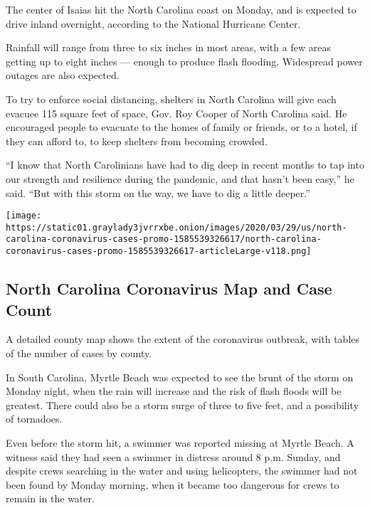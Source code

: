 The center of Isaias hit the North Carolina coast on Monday, and is
expected to drive inland overnight, according to the National Hurricane
Center.

Rainfall will range from three to six inches in most areas, with a few
areas getting up to eight inches --- enough to produce flash flooding.
Widespread power outages are also expected.

To try to enforce social distancing, shelters in North Carolina will
give each evacuee 115 square feet of space, Gov. Roy Cooper of North
Carolina said. He encouraged people to evacuate to the homes of family
or friends, or to a hotel, if they can afford to, to keep shelters from
becoming crowded.

``I know that North Carolinians have had to dig deep in recent months to
tap into our strength and resilience during the pandemic, and that
hasn't been easy,'' he said. ``But with this storm on the way, we have
to dig a little deeper.''

\href{https://www.nytimes3xbfgragh.onion/interactive/2020/us/north-carolina-coronavirus-cases.html}{}

\texttt{[image: https://static01.graylady3jvrrxbe.onion/images/2020/03/29/us/north-carolina-coronavirus-cases-promo-1585539326617/north-carolina-coronavirus-cases-promo-1585539326617-articleLarge-v118.png]}

\hypertarget{north-carolina-coronavirus-map-and-case-count}{%
\subsection{North Carolina Coronavirus Map and Case
Count}\label{north-carolina-coronavirus-map-and-case-count}}

A detailed county map shows the extent of the coronavirus outbreak, with
tables of the number of cases by county.

In South Carolina, Myrtle Beach was expected to see the brunt of the
storm on Monday night, when the rain will increase and the risk of flash
floods will be greatest. There could also be a storm surge of three to
five feet, and a possibility of tornadoes.

Even before the storm hit, a swimmer was reported missing at Myrtle
Beach. A witness said they had seen a swimmer in distress around 8 p.m.
Sunday, and despite crews searching in the water and using helicopters,
the swimmer had not been found by Monday morning, when it became too
dangerous for crews to remain in the water.

